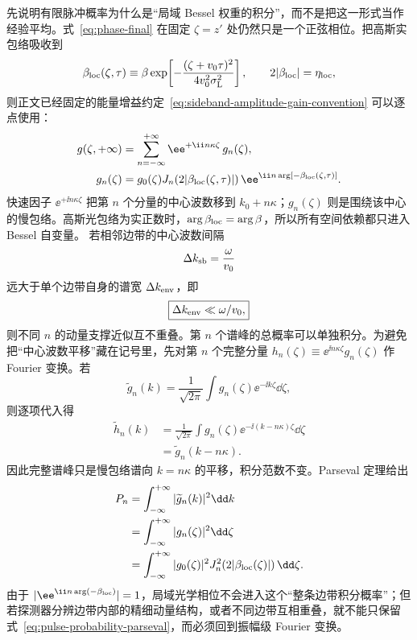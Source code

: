 先说明有限脉冲概率为什么是“局域 Bessel 权重的积分”，而不是把这一形式当作经验平均。式~\eqref{eq:phase-final} 在固定 $\zeta=z'$ 处仍然只是一个正弦相位。把高斯实包络吸收到
\begin{equation}
\beta_{\rm loc}(\zeta,\tau)
\equiv
\beta\exp\!\left[-\frac{(\zeta+v_0\tau)^2}{4v_0^2\sigma_{\rm L}^2}\right],
\qquad
2|\beta_{\rm loc}|=\eta_{\rm loc},
\label{eq:beta-local-def}
\end{equation}
则正文已经固定的能量增益约定~\eqref{eq:sideband-amplitude-gain-convention} 可以逐点使用：
\begin{align}
g(\zeta,+\infty)
&=\sum_{n=-\infty}^{+\infty}
\ee^{+\ii n\kappa\zeta}\,g_n(\zeta),
\label{eq:pulse-sideband-decomposition}\\
g_n(\zeta)
&=g_0(\zeta)
J_n\!\left(2|\beta_{\rm loc}(\zeta,\tau)|\right)
\ee^{\ii n\arg[-\beta_{\rm loc}(\zeta,\tau)]}.
\label{eq:pulse-local-sideband-amplitude}
\end{align}
快速因子 $\ee^{+\ii n\kappa\zeta}$ 把第 $n$ 个分量的中心波数移到
$k_0+n\kappa$；$g_n(\zeta)$ 则是围绕该中心的慢包络。高斯光包络为实正数时，$\arg\beta_{\rm loc}=\arg\beta$，所以所有空间依赖都只进入 Bessel 自变量。
若相邻边带的中心波数间隔
\begin{equation}
\Delta k_{\rm sb}=\frac{\omega}{v_0}
\end{equation}
远大于单个边带自身的谱宽 $\Delta k_{\rm env}$，即
\begin{equation}
\boxed{\Delta k_{\rm env}\ll \omega/v_0,}
\label{eq:sideband-orthogonality-general}
\end{equation}
则不同 $n$ 的动量支撑近似互不重叠。第 $n$ 个谱峰的总概率可以单独积分。为避免把“中心波数平移”藏在记号里，先对第 $n$ 个完整分量
$h_n(\zeta)\equiv\ee^{\ii n\kappa\zeta}g_n(\zeta)$ 作 Fourier 变换。若
\begin{equation}
\widetilde g_n(k)=\frac{1}{\sqrt{2\pi}}
\int g_n(\zeta)\ee^{-\ii k\zeta}\dd\zeta,
\end{equation}
则逐项代入得
\begin{align}
\widetilde h_n(k)
&=\frac{1}{\sqrt{2\pi}}
\int g_n(\zeta)\ee^{-\ii(k-n\kappa)\zeta}\dd\zeta\\
&=\widetilde g_n(k-n\kappa).
\label{eq:finite-pulse-fourier-shift}
\end{align}
因此完整谱峰只是慢包络谱向 $k=n\kappa$ 的平移，积分范数不变。Parseval 定理给出
\begin{align}
P_n
&=\int_{-\infty}^{+\infty}|\widetilde g_n(k)|^2\dd k\\
&=\int_{-\infty}^{+\infty}|g_n(\zeta)|^2\dd\zeta\\
&=\int_{-\infty}^{+\infty}|g_0(\zeta)|^2
J_n^2\!\left(2|\beta_{\rm loc}(\zeta)|\right)\dd\zeta.
\label{eq:pulse-probability-parseval}
\end{align}
由于 $|\ee^{\ii n\arg(-\beta_{\rm loc})}|=1$，局域光学相位不会进入这个“整条边带积分概率”；但若探测器分辨边带内部的精细动量结构，或者不同边带互相重叠，就不能只保留式~\eqref{eq:pulse-probability-parseval}，而必须回到振幅级 Fourier 变换。

